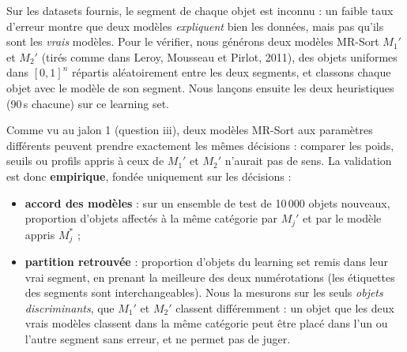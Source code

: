 \documentclass[11pt,a4paper]{article}
\begin{document}
Sur les datasets fournis, le segment de chaque objet est inconnu : un faible taux d'erreur montre que deux
modèles \emph{expliquent} bien les données, mais pas qu'ils sont les \emph{vrais} modèles. Pour le vérifier, nous
générons deux modèles MR-Sort $M_1'$ et $M_2'$ (tirés comme dans Leroy, Mousseau et Pirlot, 2011), des objets
uniformes dans $[0,1]^n$ répartis aléatoirement entre les deux segments, et classons chaque objet avec le
modèle de son segment. Nous lançons ensuite les deux heuristiques (90\,s chacune) sur ce learning set.

Comme vu au jalon 1 (question iii), deux modèles MR-Sort aux paramètres différents peuvent prendre exactement
les mêmes décisions : comparer les poids, seuils ou profils appris à ceux de $M_1'$ et $M_2'$ n'aurait pas de
sens. La validation est donc \textbf{empirique}, fondée uniquement sur les décisions :
\begin{itemize}
  \item \textbf{accord des modèles} : sur un ensemble de test de 10\,000 objets nouveaux, proportion d'objets
        affectés à la même catégorie par $M_j'$ et par le modèle appris $M_j^*$ ;
  \item \textbf{partition retrouvée} : proportion d'objets du learning set remis dans leur vrai segment, en
        prenant la meilleure des deux numérotations (les étiquettes des segments sont interchangeables). Nous
        la mesurons sur les seuls \emph{objets discriminants}, que $M_1'$ et $M_2'$ classent différemment :
        un objet que les deux vrais modèles classent dans la même catégorie peut être placé dans l'un ou
        l'autre segment sans erreur, et ne permet pas de juger.
\end{itemize}
\end{document}

